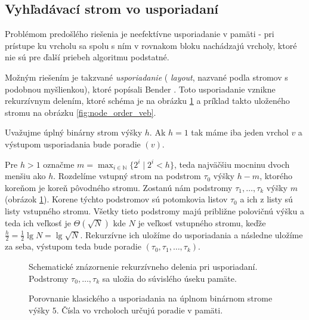 \subsection{Vyhľadávací strom vo  usporiadaní} \label{sec:static-obliv}
Problémom predošlého riešenia je neefektívne usporiadanie v pamäti - pri prístupe ku vrcholu sa spolu s ním v rovnakom bloku nachádzajú vrcholy, ktoré nie sú pre ďalší priebeh algoritmu podstatné. 

Možným riešením je takzvané  \emph{usporiadanie} (\vEB{} \emph{layout}, nazvané podla  stromov s podobnou myšlienkou), ktoré popísali Bender \etal\citep{btreeshort, btreefull}. Toto usporiadanie vznikne rekurzívnym delením, ktoré schéma je na obrázku \ref{fig:veblayout_scheme} a príklad takto uloženého stromu na obrázku \ref{fig:node_order_veb}.

Uvažujme úplný binárny strom výšky $h$. Ak $h=1$ tak máme iba jeden vrchol $v$ a výstupom usporiadania bude poradie $(v)$.

Pre $h>1$ označme $m = \max_{i\in\mathbb{N}}\{2^i \mid 2^i < h\}$, teda najväčšiu mocninu dvoch menšiu ako $h$. Rozdelíme vstupný strom na podstrom $\tau_0$ výšky $h-m$, ktorého koreňom je koreň pôvodného stromu. Zostanú nám podstromy $\tau_1,\dotsc,\tau_k$ výšky $m$ (obrázok \ref{fig:veblayout_scheme}). Korene týchto podstromov sú potomkovia listov $\tau_0$ a ich z listy sú listy vstupného stromu. Všetky tieto podstromy majú približne polovičnú výšku a teda ich veľkosť je $\Theta(\sqrt{N})$ kde $N$ je veľkosť vstupného stromu, keďže $\frac{h}{2} = \frac{1}{2}\lg{N} = \lg{\sqrt{N}}$. Rekurzívne ich uložíme do  usporiadania a následne uložíme za seba, výstupom teda bude poradie $(\tau_0,\tau_1,\dotsc,\tau_k)$.

\begin{figure}
    \centering
    \resizebox{0.9\textwidth}{!}{
        
    }
    \caption[Schematické znázornenie rekurzívneho delenia]{Schematické znázornenie rekurzívneho delenia pri  usporiadaní. Podstromy $\tau_0,\dotsc,\tau_k$ sa uložia do súvislého úseku pamäte.}
    \label{fig:veblayout_scheme}
\end{figure}

\begin{figure}
    \centering
    \caption[Porovnanie klasického a  usporiadania]{Porovnanie klasického a  usporiadania na úplnom binárnom strome výšky $5$. Čísla vo vrcholoch určujú poradie v pamäti.}
    \label{fig:node_order_comparison}
\end{figure}

